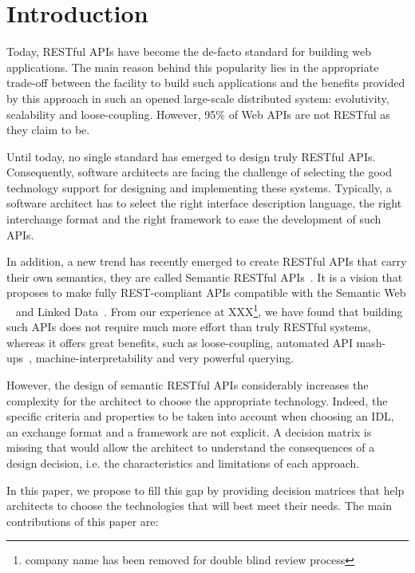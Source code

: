 \section{Introduction}

Today, RESTful APIs \cite{FieldingThesis} have become the de-facto standard for building web applications. The main reason behind this popularity lies in the appropriate trade-off between the facility to build such applications and the benefits provided by this approach in such an opened large-scale distributed system: evolutivity, scalability and loose-coupling. However, 95\% of Web APIs are not RESTful \cite{10.1007/978-3-319-38791-8_2} as they claim to be.

Until today, no single standard has emerged to design truly RESTful APIs. Consequently, software architects are facing the challenge of selecting the good technology support for designing and implementing these systems. Typically, a software architect has to select the right interface description language, the right  interchange format and the right framework to ease the development of such APIs.

In addition, a new trend has recently emerged to create RESTful APIs that carry their own semantics, they are called Semantic RESTful APIs~\cite{7195633}. It is a vision that proposes to make fully REST-compliant APIs compatible with the Semantic Web ~\cite{TheSemanticWeb} and Linked Data~\cite{LinkedDataPrinciples}. From our experience at XXX\footnote{company name has been removed for double blind review process}, we have found that building such APIs does not require much more effort than truly RESTful systems, whereas it offers great benefits, such as loose-coupling, automated API mash-ups~\cite{benslimane2008services}, machine-interpretability and very powerful querying. 

However, the design of semantic RESTful APIs considerably increases the complexity for the architect to choose the appropriate technology. Indeed, the specific criteria and properties to be taken into account when choosing an IDL, an exchange format and a framework are not explicit. A decision matrix is missing that would allow the architect to understand the consequences of a design decision, i.e. the characteristics and limitations of each approach.
 
In this paper, we propose to fill this gap by providing decision matrices that help architects to choose the technologies that will best meet their needs. The main contributions of this paper are:


